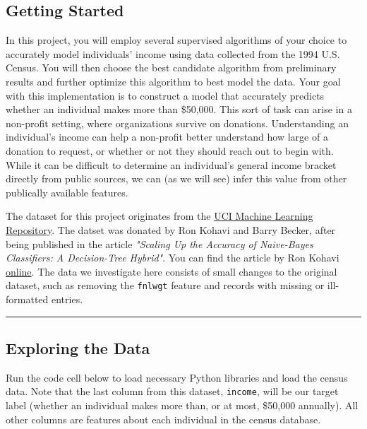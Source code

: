 \documentclass[11pt]{article}
\begin{document}
    \subsection{Getting Started}\label{getting-started}

In this project, you will employ several supervised algorithms of your
choice to accurately model individuals' income using data collected from
the 1994 U.S. Census. You will then choose the best candidate algorithm
from preliminary results and further optimize this algorithm to best
model the data. Your goal with this implementation is to construct a
model that accurately predicts whether an individual makes more than
\$50,000. This sort of task can arise in a non-profit setting, where
organizations survive on donations. Understanding an individual's income
can help a non-profit better understand how large of a donation to
request, or whether or not they should reach out to begin with. While it
can be difficult to determine an individual's general income bracket
directly from public sources, we can (as we will see) infer this value
from other publically available features.

The dataset for this project originates from the
\href{https://archive.ics.uci.edu/ml/datasets/Census+Income}{UCI Machine
Learning Repository}. The datset was donated by Ron Kohavi and Barry
Becker, after being published in the article \emph{"Scaling Up the
Accuracy of Naive-Bayes Classifiers: A Decision-Tree Hybrid"}. You can
find the article by Ron Kohavi
\href{https://www.aaai.org/Papers/KDD/1996/KDD96-033.pdf}{online}. The
data we investigate here consists of small changes to the original
dataset, such as removing the
\texttt{\textquotesingle{}fnlwgt\textquotesingle{}} feature and records
with missing or ill-formatted entries.

    \begin{center}\rule{0.5\linewidth}{\linethickness}\end{center}

\subsection{Exploring the Data}\label{exploring-the-data}

Run the code cell below to load necessary Python libraries and load the
census data. Note that the last column from this dataset,
\texttt{\textquotesingle{}income\textquotesingle{}}, will be our target
label (whether an individual makes more than, or at most, \$50,000
annually). All other columns are features about each individual in the
census database.
\end{document}
